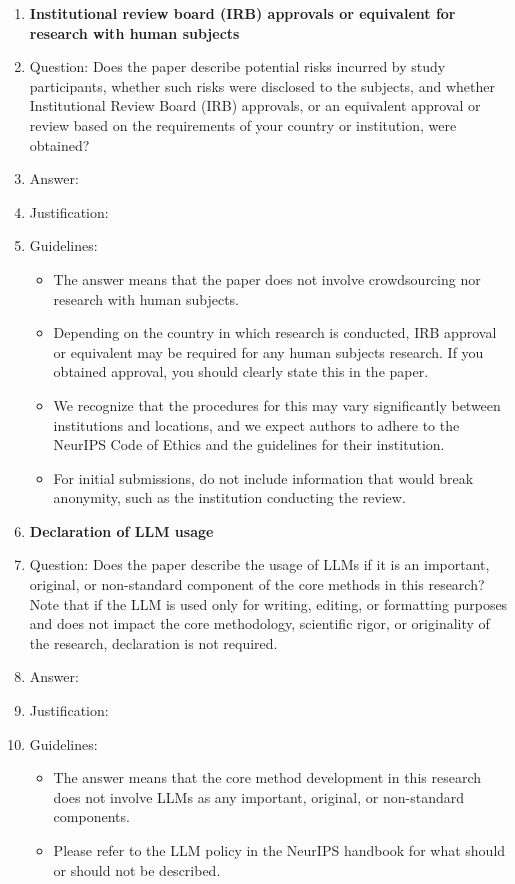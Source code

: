 \begin{enumerate}
\item {\bf Institutional review board (IRB) approvals or equivalent for research with human subjects}
    \item[] Question: Does the paper describe potential risks incurred by study participants, whether such risks were disclosed to the subjects, and whether Institutional Review Board (IRB) approvals, or an equivalent approval or review based on the requirements of your country or institution, were obtained?
    \item[] Answer: \answerTODO{}
    \item[] Justification: \justificationTODO{}
    \item[] Guidelines:
    \begin{itemize}
        \item The answer \answerNA{} means that the paper does not involve crowdsourcing nor research with human subjects.
        \item Depending on the country in which research is conducted, IRB approval or equivalent may be required for any human subjects research. If you obtained approval, you should clearly state this in the paper.
        \item We recognize that the procedures for this may vary significantly between institutions and locations, and we expect authors to adhere to the NeurIPS Code of Ethics and the guidelines for their institution.
        \item For initial submissions, do not include information that would break anonymity, such as the institution conducting the review.
    \end{itemize}

\item {\bf Declaration of LLM usage}
    \item[] Question: Does the paper describe the usage of LLMs if it is an important, original, or non-standard component of the core methods in this research? Note that if the LLM is used only for writing, editing, or formatting purposes and does not impact the core methodology, scientific rigor, or originality of the research, declaration is not required.
    \item[] Answer: \answerTODO{}
    \item[] Justification: \justificationTODO{}
    \item[] Guidelines:
    \begin{itemize}
        \item The answer \answerNA{} means that the core method development in this research does not involve LLMs as any important, original, or non-standard components.
        \item Please refer to the LLM policy in the NeurIPS handbook for what should or should not be described.
    \end{itemize}

\end{enumerate}
